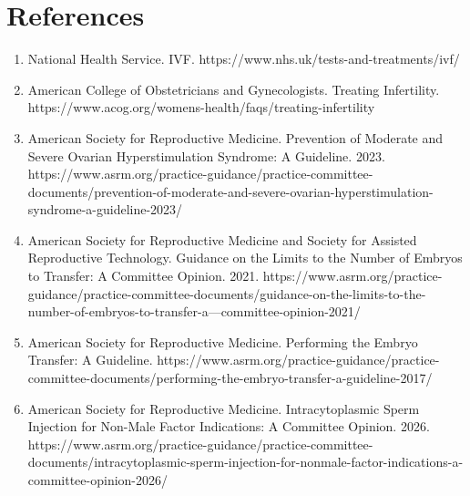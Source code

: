 \section*{References}
\begin{enumerate}
  \item National Health Service. IVF. https://www.nhs.uk/tests-and-treatments/ivf/
  \item American College of Obstetricians and Gynecologists. Treating Infertility. https://www.acog.org/womens-health/faqs/treating-infertility
  \item American Society for Reproductive Medicine. Prevention of Moderate and Severe Ovarian Hyperstimulation Syndrome: A Guideline. 2023. https://www.asrm.org/practice-guidance/practice-committee-documents/prevention-of-moderate-and-severe-ovarian-hyperstimulation-syndrome-a-guideline-2023/
  \item American Society for Reproductive Medicine and Society for Assisted Reproductive Technology. Guidance on the Limits to the Number of Embryos to Transfer: A Committee Opinion. 2021. https://www.asrm.org/practice-guidance/practice-committee-documents/guidance-on-the-limits-to-the-number-of-embryos-to-transfer-a---committee-opinion-2021/
  \item American Society for Reproductive Medicine. Performing the Embryo Transfer: A Guideline. https://www.asrm.org/practice-guidance/practice-committee-documents/performing-the-embryo-transfer-a-guideline-2017/
  \item American Society for Reproductive Medicine. Intracytoplasmic Sperm Injection for Non-Male Factor Indications: A Committee Opinion. 2026. https://www.asrm.org/practice-guidance/practice-committee-documents/intracytoplasmic-sperm-injection-for-nonmale-factor-indications-a-committee-opinion-2026/
\end{enumerate}

\clearpage

